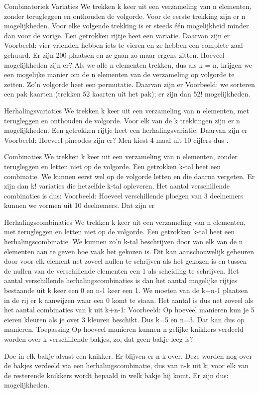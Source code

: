\documentclass[11pt,a4paper]{amsart}
\begin{document}
Combinatoriek
Variaties
We trekken k keer uit een verzameling van n elementen, zonder 
terugleggen en onthouden de volgorde. Voor de eerste trekking zijn er 
n 
mogelijkheden. Voor elke volgende trekking is er steeds één mogelijkheid minder 
dan voor de vorige. Een getrokken rijtje heet een variatie. Daarvan 
zijn er
Voorbeeld: vier vrienden hebben iets te vieren en ze hebben een complete zaal 
gehuurd. Er zijn 200 plaatsen en ze gaan zo maar ergens zitten. Hoeveel 
mogelijkheden zijn er?
Als we alle n elementen trekken, dus als k = n, krijgen we een 
mogelijke manier om de n elementen van de verzameling op volgorde te zetten. 
Zo'n volgorde heet een permutatie. Daarvan zijn er
Voorbeeld: we sorteren een pak kaarten (trekken 52 kaarten uit het pak); er
zijn dan 52! mogelijkheden.

Herhalingsvariaties
We trekken k keer uit een verzameling van n elementen, met 
terugleggen en onthouden de volgorde. Voor elk van de k trekkingen 
zijn er n mogelijkheden. Een getrokken rijtje heet een 
herhalingsvariatie. Daarvan zijn er
Voorbeeld: Hoeveel pincodes zijn er? Men kiest 4 maal uit 10 cijfers dus .

Combinaties
We trekken k keer uit een verzameling van n elementen, zonder 
terugleggen en letten niet op de volgorde. Een getrokken k-tal heet 
een 
combinatie. We kunnen eerst wel op de volgorde letten en die daarna 
vergeten. Er zijn dan k! variaties die hetzelfde k-tal opleveren. Het 
aantal 
verschillende combinaties is dus:
Voorbeeld: Hoeveel verschillende ploegen van 3 deelnemers kunnen we vormen uit 
10 deelnemers. Dat zijn er

Herhalingscombinaties
We trekken k keer uit een verzameling van n elementen, met 
terugleggen 
en letten niet op de volgorde. Een getrokken k-tal heet een 
herhalingscombinatie. We kunnen zo'n k-tal beschrijven door van elk van de 
n elementen aan te geven hoe vaak het gekozen is. Dit kan aanschouwelijk 
gebeuren door voor elk element net zoveel nullen te schrijven als het gekozen 
is 
en tussen de nullen van de verschillende elementen een 1 als scheiding te 
schrijven. Het aantal verschillende herhalingscombinaties is dan het aantal 
mogelijke rijtjes bestaande uit k keer een 0 en n-1 keer een 1. We 
moeten van 
de k+n-1 plaatsen in de rij er k aanwijzen waar een 0 komt te staan. 
Het aantal 
is dus net zoveel als het aantal combinaties van k uit k+n-1:
Voorbeeld: Op hoeveel manieren kun je 5 eieren kleuren als je over 3 kleuren 
beschikt. Dus k=5 en n=3. Dat kan dus op
manieren.
Toepassing
Op hoeveel manieren kunnen n gelijke knikkers verdeeld worden over k 
verschillende bakjes, zo, dat geen bakje leeg is?

Doe in elk bakje alvast een knikker. Er blijven er n-k over. Deze worden 
nog over de bakjes verdeeld via een herhalingscombinatie, dus van n-k uit 
k; voor elk van de resterende knikkers wordt bepaald in welk bakje hij 
komt. Er zijn dus:
mogelijkheden.
\end{document}
